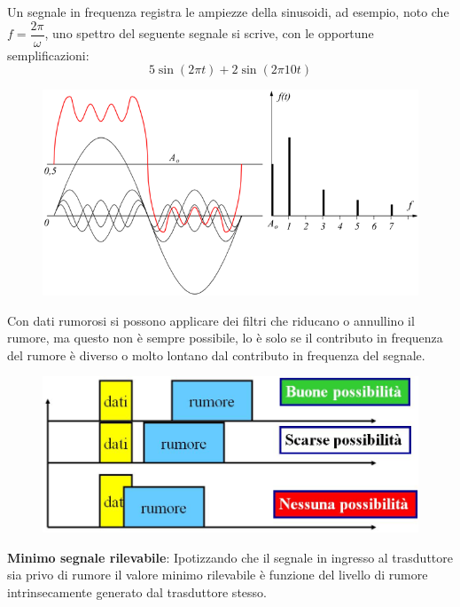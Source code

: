 \documentclass[a4paper, 15pt]{article}
\begin{document}
\begin{adjustwidth}{2in}{}
\begin{enumerate}
	Un segnale in frequenza registra le ampiezze della sinusoidi, ad esempio, noto che $f = \dfrac{2\pi}{\omega}$, uno spettro del seguente segnale si scrive, con le opportune semplificazioni: 
	\[ 5\sin(2\pi t) + 2\sin(2\pi 10t)\]	
\begin{figure}[H]
	\centering
	\includegraphics[width=0.7\linewidth]{fig/16}
	\label{fig:16}
\end{figure}
	Con dati rumorosi si possono applicare dei filtri che riducano o annullino il rumore, ma questo non è sempre possibile, lo è solo se il contributo in frequenza del rumore è diverso o molto lontano dal contributo in frequenza del segnale. 	
\begin{figure}[H]
	\centering
	\includegraphics[width=0.5\linewidth]{fig/screenshot022}
	\label{fig:screenshot022}
\end{figure}
	\textbf{Minimo segnale rilevabile}: Ipotizzando che il segnale in ingresso al trasduttore sia privo di rumore il
	valore minimo rilevabile è funzione del livello di rumore intrinsecamente
	generato dal trasduttore stesso.		
\end{enumerate}
\end{adjustwidth}
\newpage
\end{document}
